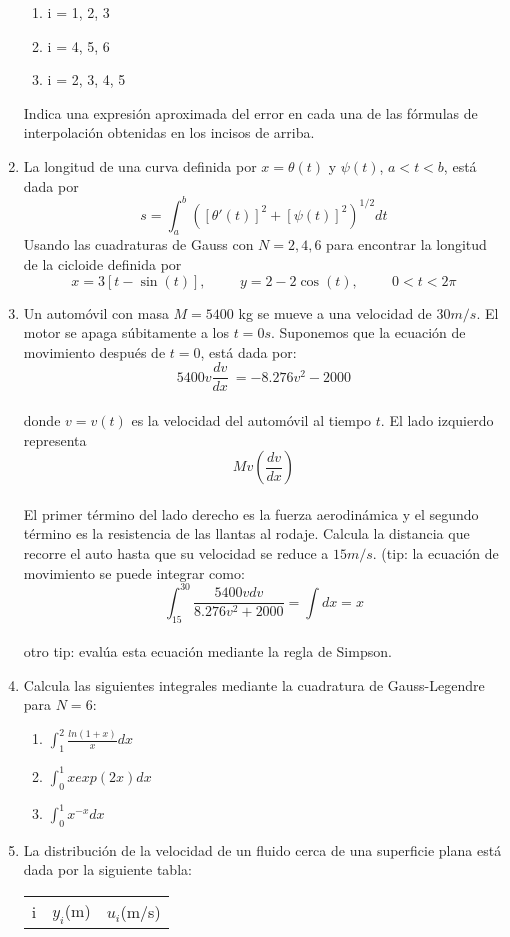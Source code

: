 \documentclass[12pt]{article}
\begin{document}
\begin{enumerate}
\begin{enumerate}
\item i = 1, 2, 3
\item i = 4, 5, 6
\item i = 2, 3, 4, 5
\end{enumerate}
Indica una expresión aproximada del error en cada una de las fórmulas de interpolación obtenidas en los incisos de arriba.
\item La longitud de una curva definida por $x=\theta(t)$ y $\psi(t)$, $a<t<b$, está dada por
\[ s=\int_{a}^{b}\left( [\theta'(t)]^{2}+[\psi(t)]^{2}\right)^{1/2} dt \]
Usando las cuadraturas de Gauss con $N=2,4,6$ para encontrar la longitud de la cicloide definida por
\[ x=3[t-\sin(t)], \hspace{1cm}  y=2-2\cos(t), \hspace{1cm} 0<t<2\pi\]
\item Un automóvil con masa $M=5400$ kg se mueve a una velocidad de $30 m/s$. El motor se apaga súbitamente a los $t=0 s$. Suponemos que la ecuación de movimiento después de $t=0$, está dada por: \\
\[ 5400v \frac{dv}{dx} \ = -8.276v^{2}-2000 \]
\\
donde $v=v(t)$ es la velocidad del automóvil al tiempo $t$. El lado izquierdo representa \[ Mv (\frac{dv}{dx}) \]\\ El primer término del lado derecho es la fuerza aerodinámica y el segundo término es la resistencia de las llantas al rodaje. Calcula la distancia que recorre el auto hasta que su velocidad se reduce a $15 m/s$. (tip: la ecuación de movimiento se puede integrar como:\\
\[ \int_{15}^{30} \frac{5400vdv}{8.276v^{2}+2000} =\int dx = x \]
\\
otro tip: evalúa esta ecuación mediante la regla de Simpson.
\item Calcula las siguientes integrales mediante la cuadratura de Gauss-Legendre para $N=6$:
\begin{enumerate}
\item $\int_{1}^{2} \frac{ln(1+x)}{x} dx$
\item $\int_{0}^{1} {xexp(2x)} dx$
\item $\int_{0}^{1} x^{-x} dx$ 
\end{enumerate}
\item La distribución de la velocidad de un fluido cerca de una superficie plana está dada por la siguiente tabla:
\begin{center}
\begin{tabular}{c | l | l}
i & $y_{i}$(m) & $u_{i}$(m/s) \\

\end{tabular}
\end{center}
\end{enumerate}
\end{document}
